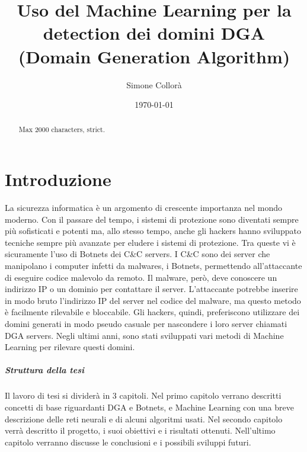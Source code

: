 \documentclass[12pt,a4paper,openright,twoside]{book}
\title{Uso del Machine Learning per la detection dei domini DGA \break (Domain Generation Algorithm)}
\author{Simone Collorà}
\date{\today}
\begin{document}
\frontmatter\frontispiece
\nocite{*}

\begin{abstract}	
Max 2000 characters, strict.
\end{abstract}



\tableofcontents   
\listoffigures     %

\mainmatter

\chapter{Introduzione}
\label{chap:introduction}

La sicurezza informatica è un argomento di crescente importanza
nel mondo moderno. Con il passare del tempo,
i sistemi di protezione sono diventati sempre più sofisticati
e potenti ma, allo stesso tempo, anche gli hackers 
hanno sviluppato tecniche sempre più avanzate per eludere i sistemi di protezione.
Tra queste vi è sicuramente l'uso di Botnets
dei \acrfull{C&C} servers. I \acrshort{C&C} sono dei server che manipolano
i computer infetti da malwares, i Botnets, permettendo
all'attaccante di eseguire codice malevolo da remoto.
Il malware, però, deve conoscere un indirizzo IP o un dominio
per contattare il server. L'attaccante potrebbe
inserire in modo bruto l'indirizzo IP del server nel codice del malware,
ma questo metodo è facilmente rilevabile e bloccabile.
Gli hackers, quindi, preferiscono utilizzare dei domini
generati in modo pseudo casuale per nascondere i loro server chiamati
\acrfull{DGA} servers. Negli ultimi anni, sono stati sviluppati
vari metodi di Machine Learning per rilevare questi domini.



\paragraph{Struttura della tesi}
Il lavoro di tesi si dividerà in 3 capitoli. Nel primo
capitolo verrano descritti concetti di base riguardanti \acrshort{DGA} e Botnets,
e Machine Learning con una breve descrizione delle reti neurali e di alcuni
algoritmi usati. Nel secondo capitolo verrà descritto il progetto,
i suoi obiettivi e i risultati ottenuti. Nell'ultimo capitolo
verranno discusse le conclusioni e i possibili sviluppi futuri.
\end{document}
